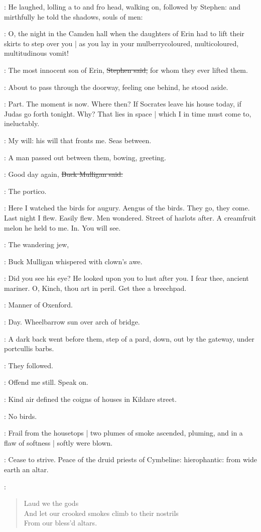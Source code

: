 :
He laughed,
lolling a to and fro head,
walking on,
followed by Stephen:
and mirthfully he told the shadows,
souls of men:

\mulligan:
O,
the night in the Camden hall when the daughters of Erin had to lift their skirts to step over you |
as you lay in your mulberrycoloured, multicoloured, multitudinous vomit!

\Stephen:
The most innocent son of Erin,
\sout{Stephen said,}
for whom they ever lifted them.

:
About to pass through the doorway,
feeling one behind,
he stood aside.

\StephenInt:
Part.
The moment is now.
Where then?
If Socrates leave his house today,
if Judas go forth tonight.
Why?
That lies in space |
which I in time must come to,
ineluctably.

\StephenInt:
My will:
his will that fronts me.
Seas between.

:
A man passed out between them,
bowing,
greeting.

\mulligan:
Good day again,
\sout{Buck Mulligan said.}

\StephenInt:
The portico.

\StephenInt:
Here I watched the birds for augury.
Aengus of the birds.
They go,
they come.
Last night I flew.
Easily flew.
Men wondered.
Street of harlots after.
A creamfruit melon he held to me.
In.
You will see.

\mulligan:
The wandering jew,

:
Buck Mulligan whispered with clown's awe.

\mulligan:
Did you see his eye?
He looked upon you to lust after you.
I fear thee,
ancient mariner.
O, Kinch,
thou art in peril.
Get thee a breechpad.

\StephenInt:
Manner of Oxenford.

\StephenInt:
Day.
Wheelbarrow sun over arch of bridge.

:
A dark back went before them,
step of a pard,
down,
out by the gateway,
under portcullis barbs.

:
They followed.

\StephenInt:
Offend me still.
Speak on.

:
Kind air defined the coigns of houses in Kildare street.

\StephenInt:
No birds.

:
Frail from the housetops |
two plumes of smoke ascended,
pluming,
and in a flaw of softness |
softly were blown.

\StephenInt:
Cease to strive.
Peace of the druid priests of Cymbeline:
hierophantic:
from wide earth an altar.

\StephenInt:
\begin{verse}
    Laud we the gods \\
    And let our crooked smokes climb to their nostrils \\
    From our bless'd altars.
\end{verse}

